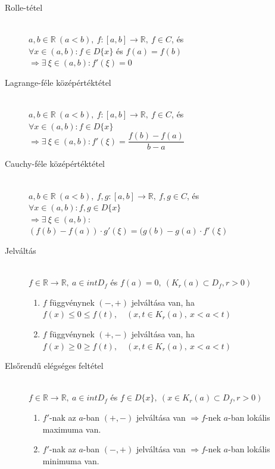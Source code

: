 \documentclass[margin=0px]{article}
\newcommand{\R}{\mathbb{R}}
\begin{document}
			\begin{description}
				\item[Rolle-tétel] \hfill \\
					$ a,b \in \R \ (a<b), \ f:[a,b] \rightarrow \R, \ f\in C$, és \\
					$ \forall x\in (a,b) : f\in D\{x\} $ és $ f(a) = f(b) $ \\
					$ \Rightarrow \exists \ \xi \in (a,b) : f'(\xi) = 0 $
				\item[Lagrange-féle középértéktétel] \hfill \\
					$ a,b \in \R \ (a<b), \ f:[a,b] \rightarrow \R, \ f\in C$, és \\
					$ \forall x\in (a,b) : f\in D\{x\} $ \\
					$ \Rightarrow \exists \ \xi \in (a,b) : f'(\xi) = \dfrac{f(b)-f(a)}{b-a}  $
				\item[Cauchy-féle középértéktétel] \hfill \\
					$ a,b \in \R \ (a<b), \ f,g:[a,b] \rightarrow \R, \ f,g\in C$, és \\
					$ \forall x\in (a,b) : f,g\in D\{x\} $ \\
					$ \Rightarrow \exists \ \xi \in (a,b) :$ \\ 
					$ (f(b)-f(a))\cdot g'(\xi) = (g(b)-g(a)\cdot f'(\xi) $
			\end{description}
			\begin{description}
				\item[Jelváltás] \hfill \\
					$ f \in \R \rightarrow \R,\ a \in intD_f $ és $ f(a) = 0, \ ( K_r(a) \subset D_f, r > 0 ) $
					\begin{enumerate}
						\item $f$ függvénynek $ (-,+) $ jelváltása van, ha \\
						$ f(x) \leq 0 \leq f(t), \quad (x,t \in K_r(a), \ x<a<t) $ 
						\item $f$ függvénynek $ (+,-) $ jelváltása van, ha \\
						$ f(x) \geq 0 \geq f(t), \quad (x,t \in K_r(a), \ x<a<t) $ 
					\end{enumerate}
				\item[Elsőrendű elégséges feltétel] \hfill \\
					$ f \in \R \rightarrow \R, \ a \in intD_f $ és $ f\in D\{x\}, \ (x \in K_r(a) \subset D_f, r > 0 ) $ 
					\begin{enumerate}
						\item $f'$-nak az $a$-ban $(+,-)$ jelváltása van $\Rightarrow f$-nek $a$-ban lokális maximuma van. 
						\item $f'$-nak az $a$-ban $(-,+)$ jelváltása van $\Rightarrow f$-nek $a$-ban lokális minimuma van.
					\end{enumerate}
			\end{description}
\end{document}
